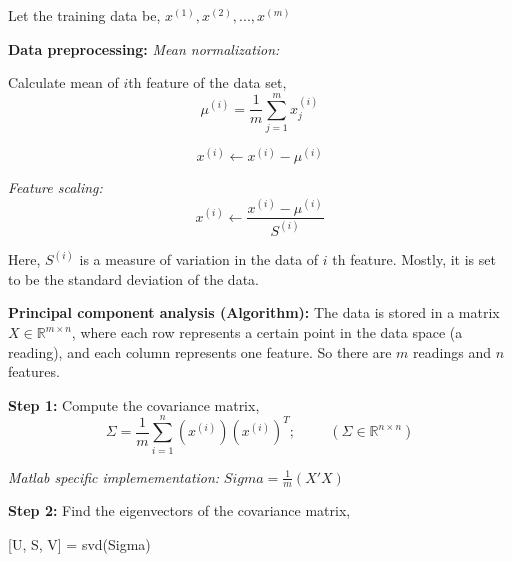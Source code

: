 \vspace{0.5cm}

\noindent Let the training data be, $ x^{(1)}, x^{(2)}, ... , x^{(m)} $

\noindent \textbf{Data preprocessing: }
\vspace{0.3cm}
\noindent\emph{Mean normalization: } 

\noindent Calculate mean of $ i $th feature of the data set,
\begin{equation}
	\mu^{(i)} = \frac{1}{m} \sum_{j=1}^{m} x_j^{(i)}
\end{equation}

\begin{equation}
	x^{(i)} \leftarrow x^{(i)} - \mu^{(i)} 
\end{equation}


\noindent\emph{Feature scaling: }
\begin{equation}
	x^{(i)} \leftarrow \frac{x^{(i)} - \mu^{(i)}}{S^{(i)}}
\end{equation}

\noindent Here, $ S^{(i)} $ is a measure of variation in the data of $ i $
th feature. Mostly, it is set to be the standard deviation of the data.

\vspace{0.5cm}

\noindent \textbf{Principal component analysis (Algorithm): }
\noindent The data is stored in a matrix $ X \in \mathbb{R}^{m \times n} $, where
each row represents a certain point in the data space (a reading), and each column
represents one feature. So there are $ m $ readings and $ n $ features.

\vspace{0.3cm}

\noindent \textbf{Step 1:} Compute the covariance matrix,
\begin{equation}
	\Sigma = \frac{1}{m} \sum_{i=1}^{n} (x^{(i)}) (x^{(i)})^T; 
	\hspace{1cm} (\Sigma \in \mathbb{R}^{n \times n})
\end{equation}

\vspace{0.25cm}

\noindent \emph{Matlab specific implemementation:} $ Sigma = \frac{1}{m} (X' X) $

\vspace{0.5cm}

\noindent \textbf{Step 2:} Find the eigenvectors of the covariance matrix,
\begin{center}
	[U, S, V] = svd(Sigma)
\end{center}


